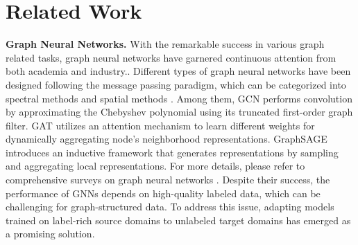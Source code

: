 \section{Related Work}
\textbf{Graph Neural Networks.} With the remarkable success in various graph related tasks, graph neural networks have garnered continuous attention from both academia and industry.. Different types of graph neural networks have been designed following the message passing paradigm, which can be categorized into spectral methods \cite{defferrard2016convolutional,kipf2016semi,bianchi2021graph} and spatial methods \cite{velivckovic2017graph,wu2019simplifying,hamilton2017inductive}. Among them, GCN \cite{kipf2016semi} performs convolution by approximating the Chebyshev polynomial \cite{defferrard2016convolutional} using its truncated first-order graph filter. GAT \cite{velivckovic2017graph} utilizes an attention mechanism to learn different weights for dynamically aggregating node's neighborhood representations. GraphSAGE \cite{hamilton2017inductive} introduces an inductive framework that generates representations by sampling and aggregating local representations. For more details, please refer to comprehensive surveys on graph neural networks \cite{zhou2022graph,wu2020comprehensive}. Despite their success, the performance of GNNs depends on high-quality labeled data, which can be challenging for graph-structured data. To address this issue, adapting models trained on label-rich source domains to unlabeled target domains has emerged as a promising solution.


